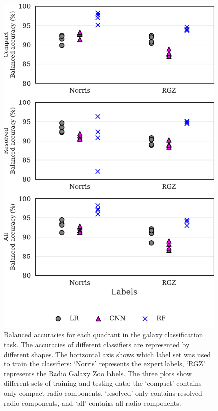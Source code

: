 \documentclass[fleqn,usenatbib,usedcolumn]{mnras}
\begin{document}
    \begin{figure}
    \centering
    \includegraphics[width=\columnwidth]{images/cdfs_ba_grid.pdf}
    \caption{Balanced accuracies for each quadrant in the galaxy
      classification task. The accuracies of different classifiers are represented
      by different shapes. The horizontal axis shows which label set was used to
      train the classifiers: `Norris' represents the expert labels, `RGZ'
      represents the Radio Galaxy Zoo labels.
      The three plots show different sets
      of training and testing data: the `compact' contains only compact radio
      components, `resolved' only contains resolved radio components, and `all'
      contains all radio components.
      \label{fig:ba}}
    \end{figure}
\end{document}
